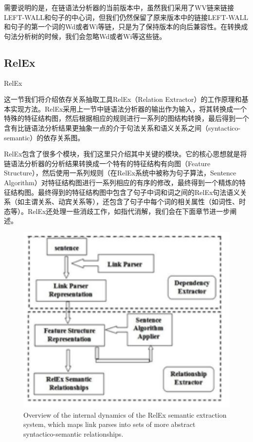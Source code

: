 需要说明的是，在链语法分析器的当前版本中，虽然我们采用了WV链来链接LEFT-WALL和句子的中心词，但我们仍然保留了原来版本中的链接LEFT-WALL和句子的第一个词的Wd或者Wi等链，只是为了保持版本的向后兼容性。在转换成句法分析树的时候，我们会忽略Wd或者Wi等这些链。

\subsection{RelEx}{RelEx}

这一节我们将介绍依存关系抽取工具RelEx（Relation Extractor）的工作原理和基本实现方法。RelEx采用上一节中链语法分析器的输出作为输入，将其转换成一个特殊的特征结构图，然后根据相应的规则进行一系列的图结构转换，最后得到一个含有比链语法分析结果更抽象一点的介于句法关系和语义关系之间（syntactico-semantic）的依存关系图。

RelEx包含了很多个模块，我们这里只介绍其中关键的模块。它的核心思想就是将链语法分析器的分析结果转换成一个特有的特征结构有向图（Feature Structure），然后使用一系列规则（在RelEx系统中被称为句子算法，Sentence Algorithm）对特征结构图进行一系列相应的有序的修改，最终得到一个精炼的特征结构图。最终得到的特征结构图中包含了句子中词和词之间的RelEx句法语义关系（如主谓关系、动宾关系等），还包含了句子中每个词的相关属性（如词性、时态等）。RelEx还处理一些消歧工作，如指代消解，我们会在下面章节进一步阐述。

\begin{figure}
\begin{centering}
\includegraphics[width=12cm]{figures/RelEx.png}
\protect\caption{\label{fig:relex}Overview of the internal dynamics of the RelEx semantic extraction system, which maps link parses into sets of more abstract syntactico-semantic relationships.}
\end{centering}
\end{figure}

